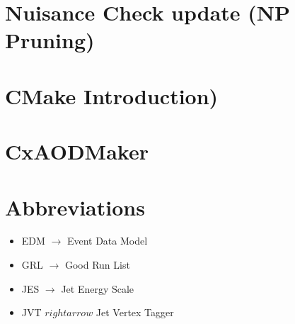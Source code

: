 \section{Nuisance Check update (NP Pruning)}


\section{CMake Introduction)}
%
%  
%  
%  

\section{CxAODMaker} 



\section{Abbreviations}
\begin{itemize} 
\item EDM $\rightarrow$ Event Data Model 
\item GRL $\rightarrow$ Good Run List 
\item JES $\rightarrow$ Jet Energy Scale
\item JVT $rightarrow$  Jet Vertex Tagger
\end{itemize}




